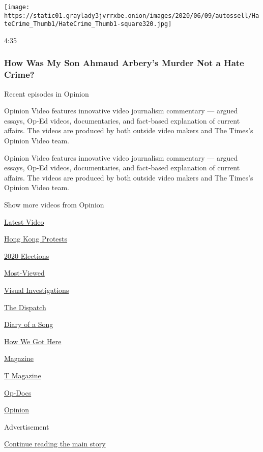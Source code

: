 \begin{itemize}
  \texttt{[image: https://static01.graylady3jvrrxbe.onion/images/2020/06/09/autossell/HateCrime\_Thumb1/HateCrime\_Thumb1-square320.jpg]}

  4:35

  \hypertarget{how-was-my-son-ahmaud-arberys-murder-not-a-hate-crime}{%
  \subsubsection{How Was My Son Ahmaud Arbery's Murder Not a Hate
  Crime?}\label{how-was-my-son-ahmaud-arberys-murder-not-a-hate-crime}}
\end{itemize}

Recent episodes in Opinion

Opinion Video features innovative video journalism commentary --- argued
essays, Op-Ed videos, documentaries, and fact-based explanation of
current affairs. The videos are produced by both outside video makers
and The Times's Opinion Video team.

Opinion Video features innovative video journalism commentary --- argued
essays, Op-Ed videos, documentaries, and fact-based explanation of
current affairs. The videos are produced by both outside video makers
and The Times's Opinion Video team.

Show more videos from Opinion

\href{/video}{}

\href{/video/latest-video}{Latest Video}

\href{/video/hk-protest}{Hong Kong Protests}

\href{/video/2020-Elections}{2020 Elections}

\href{/video/Most-Viewed}{Most-Viewed}

\href{/video/investigations}{Visual Investigations}

\href{/video/on-the-ground}{The Dispatch}

\href{/video/diaryofasong}{Diary of a Song}

\href{/video/how-we-got-here}{How We Got Here}

\href{/video/magazine}{Magazine}

\href{/video/t-magazine}{T Magazine}

\href{/video/op-docs}{Op-Docs}

\href{/video/opinion}{Opinion}

Advertisement

\protect\hyperlink{after-bottom}{Continue reading the main story}

